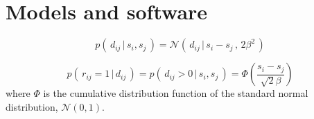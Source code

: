\documentclass[article]{jss}
\newif\ifen
\newif\ifes
\newcommand{\en}[1]{\ifen#1\fi}
\newcommand{\es}[1]{\ifes#1\fi}
\newcommand{\N}{\mathcal{N}}
\begin{document}


\section{Models and software} \label{sec:computoAnilitico}


%
\en{It can be shown [SE DEMOSTRARA EN LA SECCIÓN SIGUIENTE], based on Gaussians properties, that the difference of performance $d_{ij}$ is also normally distributed, centered at the skill difference point with double variance.}
\es{}
%
\begin{equation}
 p( \, d_{ij} \,|\,  s_i, s_j\, ) = \N(\, d_{ij} \,|\, s_i - s_j \, , \, 2\beta^2 \,)
\end{equation}
%
\en{This reduces the problem of computing the probability of the game outcome to a single-dimension problem related to the performance difference.}
\es{This reduces the problem of computing the probability of the game outcome to a single-dimension problem related to the performance difference.}
%
\en{Let the result of a game $r_{ij} = \mathbb{I}(d_{ij}>0)$.
The probability of winning, $r_{ij} = 1$, can be computed as:}
\es{}
%
\begin{equation}
p(\,r_{ij}=1\,|\,d_{ij}\,) = p(\,d_{ij} > 0 \,|\, s_i, s_j\,) = \Phi \left(\frac{s_i - s_j}{\sqrt{2}\beta} \right)
\end{equation}
%
where $\Phi$ is the cumulative distribution function of the standard normal distribution, $\N(0, 1)$.




\end{document}
